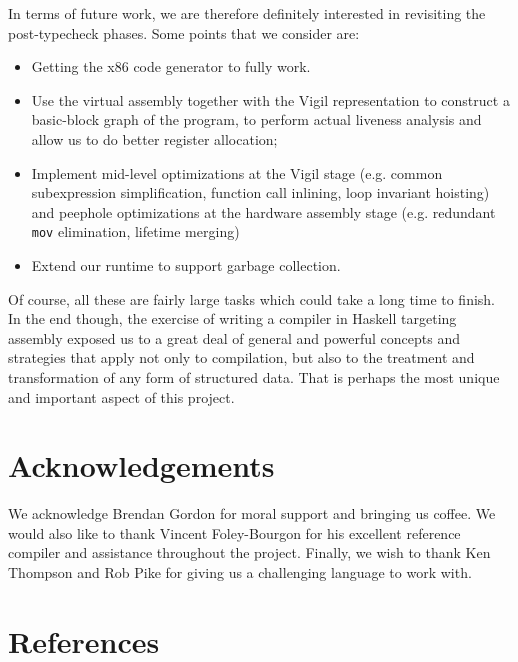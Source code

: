 \documentclass[letterpaper,11pt]{article}
\begin{document}
In terms of future work, we are therefore definitely interested in revisiting the post-typecheck phases. Some points that we consider are:
\begin{itemize}
    \item Getting the x86 code generator to fully work.
    \item Use the virtual assembly together with the Vigil representation to construct a basic-block graph of the program, to perform actual liveness analysis and allow us to do better register allocation;
    \item Implement mid-level optimizations at the Vigil stage (e.g. common subexpression simplification, function call inlining, loop invariant hoisting) and peephole optimizations at the hardware assembly stage (e.g. redundant \texttt{mov} elimination, lifetime merging)
    \item Extend our runtime to support garbage collection.
\end{itemize}

Of course, all these are fairly large tasks which could take a long time to finish. In the end though, the exercise of writing a compiler in Haskell targeting assembly exposed us to a great deal of general and powerful concepts and strategies that apply not only to compilation, but also to the treatment and transformation of any form of structured data. That is perhaps the most unique and important aspect of this project.

\section{Acknowledgements}
We acknowledge Brendan Gordon for moral support and bringing us coffee. We would also like to thank Vincent Foley-Bourgon for his excellent reference compiler and assistance throughout the project. Finally, we wish to thank Ken Thompson and Rob Pike for giving us a challenging language to work with.

\section{References}
\end{document}
